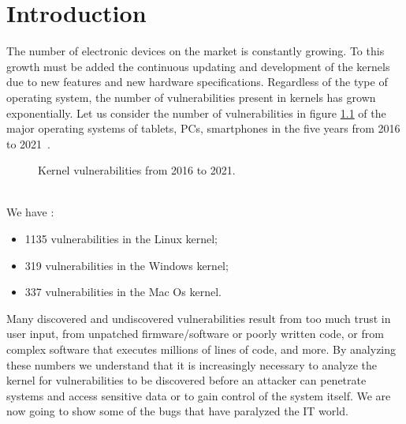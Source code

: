 \documentclass{masterthesis}
\begin{document}
\tableofcontents
\chapter{Introduction}
\label{ch:intro}
The number of electronic devices on the market is constantly growing.
To this growth must be added the continuous updating and development of the kernels due to new features and new hardware specifications. 
Regardless of the type of operating system, the number of vulnerabilities present in kernels has grown exponentially.
Let us consider the number of vulnerabilities in figure \ref{figure:kernel_vulnerabilities} of the major operating systems of tablets, PCs, smartphones in the five years from 2016 to 2021~\cite{cvedatail}.
\begin{figure}[h!]
   \caption{Kernel vulnerabilities from 2016 to 2021.}
   \label{figure:kernel_vulnerabilities}
\end{figure}
\\
We have : 
\begin{itemize}
\item 1135 vulnerabilities in the Linux kernel;
\item 319 vulnerabilities in the Windows kernel;
\item 337 vulnerabilities in the Mac Os kernel.
\end{itemize}
Many discovered and undiscovered vulnerabilities result from too much trust in user input, from unpatched firmware/software or poorly written code, or from complex software that executes millions of lines of code, and more.
By analyzing these numbers we understand that it is increasingly necessary to analyze the kernel for vulnerabilities to be discovered before an attacker can penetrate systems and access sensitive data or to gain control of the system itself.
We are now going to show some of the bugs that have paralyzed the IT world.
\end{document}

